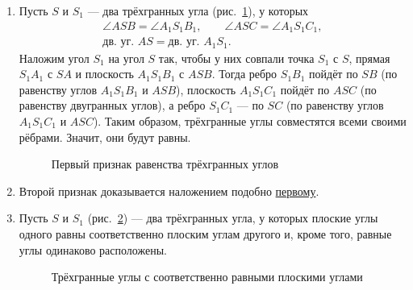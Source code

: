 \begin{enumerate}[label=\arabic*),ref=\arabic*]
    \item\label{item:trihedral-first-criterion} Пусть \(S\) и \(S_1\) --- два трёхгранных угла (рис.~\ref{fig:kiselev-stereo-350}), у которых
    \[
        \begin{gathered}
            \angle ASB=\angle A_1S_1B_1,\qquad \angle ASC=\angle A_1S_1C_1,\\
            \text{дв. уг. } AS=\text{дв. уг. } A_1S_1.
        \end{gathered}
    \]
    Наложим угол \(S_1\) на угол \(S\) так, чтобы у них совпали точка \(S_1\) с \(S\), прямая \(S_1A_1\) с \(SA\) и плоскость \(A_1S_1B_1\) с \(ASB\). Тогда ребро \(S_1B_1\) пойдёт по \(SB\) (по равенству углов \(A_1S_1B_1\) и \(ASB\)), плоскость \(A_1S_1C_1\) пойдёт по \(ASC\) (по равенству двугранных углов), а ребро \(S_1C_1\) --- по \(SC\) (по равенству углов \(A_1S_1C_1\) и \(ASC\)). Таким образом, трёхгранные углы совместятся всеми своими рёбрами. Значит, они будут равны.

    \begin{figure}[htbp]
        \centering
        \renewcommand{\thefigure}{350}
        \captionsetup{name=Рис.,labelsep=period}
        
        \caption{Первый признак равенства трёхгранных углов}\label{fig:kiselev-stereo-350}
    \end{figure}

    \item Второй признак доказывается наложением подобно \hyperref[item:trihedral-first-criterion]{первому}.

    \item Пусть \(S\) и \(S_1\) (рис.~\ref{fig:kiselev-stereo-351}) --- два трёхгранных угла, у которых плоские углы одного равны соответственно плоским углам другого и, кроме того, равные углы одинаково расположены.

    \begin{figure}[htbp]
        \centering
        \renewcommand{\thefigure}{351}
        \captionsetup{name=Рис.,labelsep=period}
        
        \caption{Трёхгранные углы с соответственно равными плоскими углами}\label{fig:kiselev-stereo-351}
    \end{figure}


\end{enumerate}
